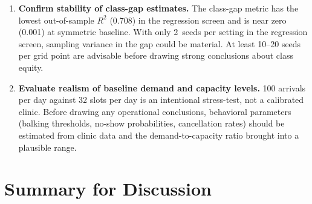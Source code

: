 \documentclass[11pt]{article}
\begin{document}
\begin{checkenv}
\begin{enumerate}[leftmargin=1.5em, itemsep=4pt]
\item \textbf{Confirm stability of class-gap estimates.}
The class-gap metric has the lowest out-of-sample $R^2$ (0.708) in the
regression screen and is near zero (0.001) at symmetric baseline. With
only 2~seeds per setting in the regression screen, sampling variance in
the gap could be material. At least 10--20 seeds per grid point are
advisable before drawing strong conclusions about class equity.

\item \textbf{Evaluate realism of baseline demand and capacity levels.}
100 arrivals per day against 32 slots per day is an intentional
stress-test, not a calibrated clinic. Before drawing any operational
conclusions, behavioral parameters (balking thresholds, no-show
probabilities, cancellation rates) should be estimated from clinic data
and the demand-to-capacity ratio brought into a plausible range.
\end{enumerate}
\end{checkenv}

\section{Summary for Discussion}
\label{sec:summary}
\end{document}
